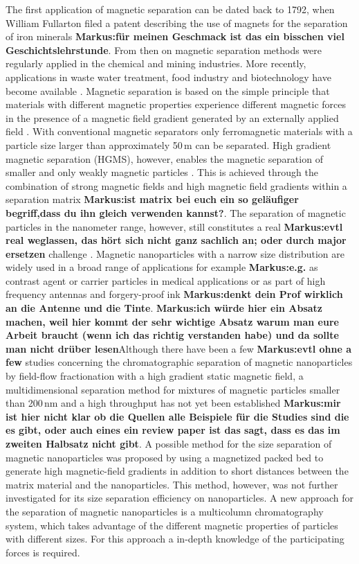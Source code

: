 The first application of magnetic separation can be dated back to 1792, when William Fullarton filed a patent describing the use of magnets for the separation of iron minerals \cite{1794repertory}\textbf{Markus:für meinen Geschmack ist das ein bisschen viel Geschichtslehrstunde}. From then on magnetic separation methods were regularly applied in the chemical and mining industries. More recently, applications in waste water treatment, food industry and biotechnology have become available \cite{yavuz2009magnetic}. Magnetic separation is based on the simple principle that materials with different magnetic properties experience different magnetic forces in the presence of a magnetic field gradient generated by an externally applied field \cite{svoboda2004magnetic}. With conventional magnetic separators only ferromagnetic materials with a particle size larger than approximately 50\,\textmu m can be separated. High gradient magnetic separation (HGMS), however, enables the magnetic separation of smaller and only weakly magnetic particles \cite{frantz1937patent,ge2017magnetic}. This is achieved through the combination of strong magnetic fields and high magnetic field gradients within a separation matrix \textbf{Markus:ist matrix bei euch ein so geläufiger begriff,dass du ihn gleich verwenden kannst?}. The separation of magnetic particles in the nanometer range, however, still constitutes a real \textbf{Markus:evtl real weglassen, das hört sich nicht ganz sachlich an; oder durch major ersetzen} challenge \cite{mandel2012magnetic}. Magnetic nanoparticles with a narrow size distribution are widely used in a broad range of applications for example \textbf{Markus:e.g.} as contrast agent or carrier particles in medical applications or as part of high frequency antennas and forgery-proof ink \textbf{Markus:denkt dein Prof wirklich an die Antenne und die Tinte}. \textbf{Markus:ich würde hier ein Absatz machen, weil hier kommt der sehr wichtige Absatz warum man eure Arbeit braucht (wenn ich das richtig verstanden habe) und da sollte man nicht drüber lesen}Although there have been a few \textbf{Markus:evtl ohne a few} studies concerning the chromatographic separation of magnetic nanoparticles by field-flow fractionation with a high gradient static magnetic field, a multidimensional separation method for mixtures of magnetic particles smaller than 200\,nm and a high throughput has not yet been established \cite{kim2007development,williams2009magnetic,williams2010characterization} \textbf{Markus:mir ist hier nicht klar ob die Quellen alle Beispiele für die Studies sind die es gibt, oder auch eines ein review paper ist das sagt, dass es das im zweiten Halbsatz nicht gibt}. A possible method for the size separation of magnetic nanoparticles was proposed by \cite{nomizu1996magnetic} using a magnetized packed bed to generate high magnetic-field gradients in addition to short distances between the matrix material and the nanoparticles. This method, however, was not further investigated for its size separation efficiency on nanoparticles. A new approach for the separation of magnetic nanoparticles is a multicolumn chromatography system, which takes advantage of the different magnetic properties of particles with different sizes. For this approach a in-depth knowledge of the participating forces is required.    

